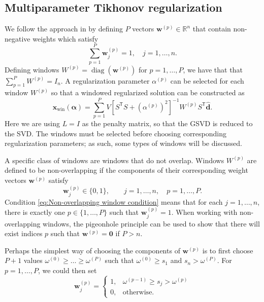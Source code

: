 \documentclass[12pt]{article}
\newcommand{\dVec}{\mathbf{d}}	%
\newcommand{\xVec}{\mathbf{x}}	%
\newcommand{\wVec}{\mathbf{w}}	%
\newcommand{\trans}[1]{{#1}^\mathsf{T}}	%
\newcommand{\inv}[1]{{#1}^{-1}}	%
\DeclareMathOperator{\diag}{diag}	%
\newcommand{\dft}[1]{\widehat{#1}}	%
\newcommand{\regparam}{\alpha}  %
\newcommand{\regparamVec}{\bm{\regparam}}   %
\newcommand{\xWin}{\xVec_{\text{win}}}	%
\newcommand{\zeroVec}{\bm{0}}	%
\newcommand{\singular}{s}	%
\begin{document}
\subsection{Multiparameter Tikhonov regularization} \label{sec:Multiparameter}
We follow the approach in \cite{ChungEasleyOLeary} by defining $P$ vectors $\wVec^{(p)} \in \mathbb{R}^n$ that contain non-negative weights which satisfy
\begin{equation}
\label{eq:Weights}
\sum_{p=1}^{P} \wVec_j^{(p)} = 1, \quad j = 1,\ldots,n.
\end{equation}
Defining windows $W^{(p)} = \diag\left(\wVec^{(p)}\right)$ for $p = 1,\ldots,P$, we have that that $\sum_{p=1}^P W^{(p)} = I_n$. A regularization parameter $\regparam^{(p)}$ can be selected for each window $W^{(p)}$ so that a windowed regularized solution can be constructed as
\begin{equation}
\label{eq:TikSolWindow}
\xWin(\regparamVec) = \sum_{p=1}^P V\inv{\left[\trans{S}S + (\regparam^{(p)})^2\right]}W^{(p)}\trans{S}\dft{\dVec}.
\end{equation}
Here we are using $L = I$ as the penalty matrix, so that the GSVD is reduced to the SVD. The windows must be selected before choosing corresponding regularization parameters; as such, some types of windows will be discussed. \par
A specific class of windows are windows that do not overlap. Windows $W^{(p)}$ are defined to be non-overlapping if the components of their corresponding weight vectors $\wVec^{(p)}$ satisfy
\begin{equation}
\label{eq:Non-overlapping window condition}
    \wVec_j^{(p)} \in \{0,1\}, \qquad j = 1,\ldots,n, \quad p = 1,\ldots,P.
\end{equation}
Condition \eqref{eq:Non-overlapping window condition} means that for each $j = 1,\ldots,n$, there is exactly one $p \in \{1,\ldots,P\}$ such that $\wVec_j^{(p)} = 1$. When working with non-overlapping windows, the pigeonhole principle \cite{DummitFoote3} can be used to show that there will exist indices $p$ such that $\wVec^{(p)} = \zeroVec$ if $P > n$. \par
Perhaps the simplest way of choosing the components of $\wVec^{(p)}$ is to first choose $P+1$ values $\omega^{(0)} \geq \ldots \geq \omega^{(P)}$ such that $\omega^{(0)} \geq \singular_1$ and $\singular_n > \omega^{(P)}$. For $p = 1,\ldots,P$, we could then set
\begin{equation}
\label{eq:Non-overlapping windows}
\wVec_j^{(p)} = \begin{cases}
1, & \omega^{(p-1)} \geq \singular_j > \omega^{(p)} \\
0, & \text{otherwise.}
\end{cases}
\end{equation}
\end{document}
